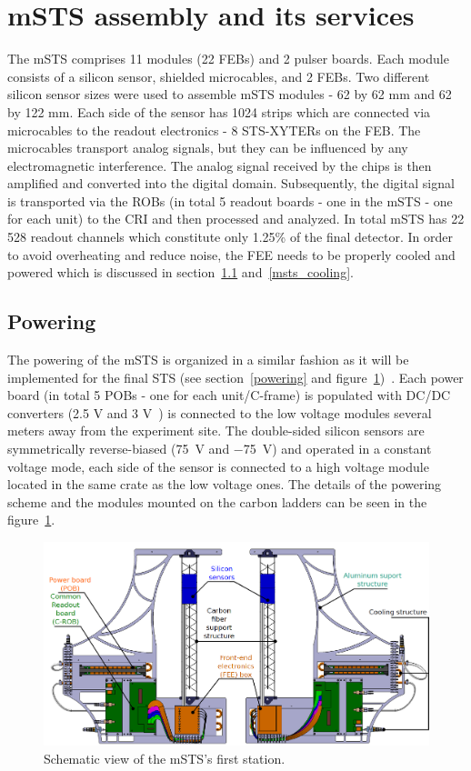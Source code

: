 \section{mSTS assembly and its services}
 The \gls{mSTS} comprises 11 modules (22 \glspl{FEB}) and 2 pulser boards. Each module consists of a silicon sensor, shielded microcables, and 2 \gls{FEB}s. Two different silicon sensor sizes were used to assemble \gls{mSTS} modules - 62 by 62 mm and 62 by 122 mm. Each side of the sensor has 1024 strips which are connected via microcables to the readout electronics - 8 STS-XYTERs on the \gls{FEB}. The microcables transport analog signals, but they can be influenced by any electromagnetic interference. The analog signal received by the chips is then amplified and converted into the digital domain. Subsequently, the digital signal is transported via the \gls{ROB}s (in total 5 readout boards - one in the \gls{mSTS} - one for each unit) to the \gls{CRI} and then processed and analyzed. In total \gls{mSTS} has 22 528 readout channels which constitute only 1.25\% of the final detector. In order to avoid overheating and reduce noise, the \gls{FEE} needs to be properly cooled and powered which is discussed in section~\ref{msts_powering} and~\ref{msts_cooling}. 
\subsection{Powering}
\label{msts_powering}
The powering of the \gls{mSTS} is organized in a similar fashion as it will be implemented for the final \gls{STS} (see section~\ref{powering} and figure~\ref{fig_msts_scheme})~\cite{Koczon:2020Jc}. Each power board (in total 5 \glspl{POB} - one for each unit/C-frame) is populated with DC/DC converters (2.5 V and 3 V~\cite{DC_DC_converter}) is connected to the low voltage modules several meters away from the experiment site. The double-sided silicon sensors are symmetrically reverse-biased (\SI{75}{V} and \SI{-75}{V}) and operated in a constant voltage mode, each side of the sensor is connected to a high voltage module located in the same crate as the low voltage ones. The details of the powering scheme and the modules mounted on the carbon ladders can be seen in the figure~\ref{fig_msts_scheme}.

\begin{figure}[!h]
\centering
\includegraphics[width=0.9\columnwidth]{Chapter6/DCS/images/unit0.png}
\caption{Schematic view of the \gls{mSTS}'s first station.}
\label{fig_msts_scheme}
\end{figure}
\newpage
